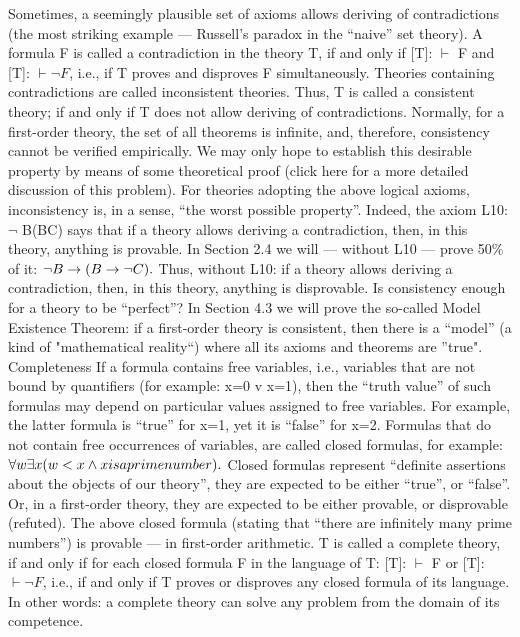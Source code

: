 Sometimes, a seemingly plausible set of axioms allows deriving of contradictions (the most striking
example --- Russell's paradox in the ``naive'' set theory). A formula F is called a contradiction in the
theory T, if and only if [T]: \(\vdash\) F and [T]: \(\vdash \neg F\), i.e., if T proves and disproves F simultaneously. Theories
containing contradictions are called inconsistent theories. Thus, T is called a consistent theory; if and
only if T does not allow deriving of contradictions.
Normally, for a first-order theory, the set of all theorems is infinite, and, therefore, consistency cannot be
verified empirically. We may only hope to establish this desirable property by means of some
theoretical proof (click here for a more detailed discussion of this problem).
For theories adopting the above logical axioms, inconsistency is, in a sense, ``the worst possible property''.
Indeed, the axiom L10: \(\neg\) B\IMPLIES (B\IMPLIES C) says that if a theory allows deriving a contradiction, then, in this
theory, anything is provable. In Section 2.4 we will --- without L10 --- prove 50\% of it: \(\neg B\rightarrow (B\rightarrow \neg C).\)
Thus, without L10: if a theory allows deriving a contradiction, then, in this theory, anything is
disprovable.
Is consistency enough for a theory to be ``perfect''? In Section 4.3 we will prove the so-called Model
Existence Theorem: if a first-order theory is consistent, then there is a ``model'' (a kind of "mathematical
reality``) where all its axioms and theorems are ''true".
Completeness
If a formula contains free variables, i.e., variables that are not bound by quantifiers (for example: x=0 v
x=1), then the ``truth value'' of such formulas may depend on particular values assigned to free variables.
For example, the latter formula is ``true'' for x=1, yet it is ``false'' for x=2. Formulas that do not contain
free occurrences of variables, are called closed formulas, for example:
\(\forall w\exists x( w<x \wedge  x is a prime number).\)
Closed formulas represent ``definite assertions about the objects of our theory'', they are expected to be
either ``true'', or ``false''. Or, in a first-order theory, they are expected to be either provable, or disprovable
(refuted). The above closed formula (stating that ``there are infinitely many prime numbers'') is provable ---
in first-order arithmetic.
T is called a complete theory, if and only if for each closed formula F in the language of T: [T]: \(\vdash\) F or
[T]: \(\vdash \neg F\), i.e., if and only if T proves or disproves any closed formula of its language. In other words: a
complete theory can solve any problem from the domain of its competence.
